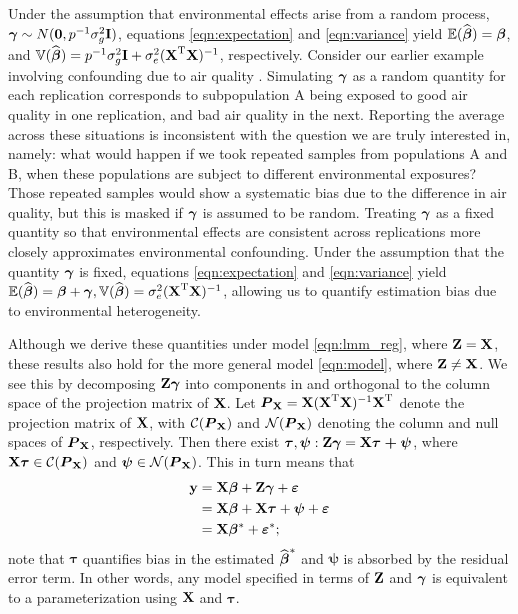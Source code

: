 Under the assumption that environmental effects arise from a random process, $\boldsymbol{\gamma} \sim N(\boldsymbol{0}, p^{-1} \sigma^2_g \textbf{I})$, equations \eqref{eqn:expectation} and \eqref{eqn:variance} yield $\mathbb{E}(\widehat{\boldsymbol{\beta}{}}) = \boldsymbol{\beta}{}$, and $\mathbb{V}(\widehat{\boldsymbol{\beta}{}}) = p^{-1}\sigma^2_g\textbf{I} + \sigma^2_e (\textbf{X}^{\text{T}} \textbf{X})^{-1}$, respectively. Consider our earlier example involving confounding due to air quality . Simulating $\boldsymbol{\gamma}$ as a random quantity for each replication corresponds to subpopulation A being exposed to good air quality in one replication, and bad air quality in the next. Reporting the average across these situations is inconsistent with the question we are truly interested in, namely: what would happen if we took repeated samples from populations A and B, when these populations are subject to different environmental exposures? Those repeated samples would show a systematic bias due to the difference in air quality, but this is masked if $\boldsymbol{\gamma}$ is assumed to be random. Treating $\boldsymbol{\gamma}$ as a fixed quantity so that environmental effects are consistent across replications more closely approximates environmental confounding. Under the assumption that the quantity $\boldsymbol{\gamma}$ is fixed, equations \eqref{eqn:expectation} and \eqref{eqn:variance} yield $\mathbb{E}(\widehat{\boldsymbol{\beta}{}}) = \boldsymbol{\beta}{} + \boldsymbol{\gamma}, \mathbb{V}(\widehat{\boldsymbol{\beta}{}}) = \sigma^2_e (\textbf{X}^{\text{T}} \textbf{X})^{-1}$, allowing us to quantify estimation bias due to environmental heterogeneity. 

Although we derive these quantities under model \eqref{eqn:lmm_reg}, where $\textbf{Z} = \textbf{X}$, these results also hold for the more general model \eqref{eqn:model}, where $\textbf{Z} \ne \textbf{X}$. We see this by decomposing $\textbf{Z} \boldsymbol{\gamma}$ into components in and orthogonal to the column space of the projection matrix of $\textbf{X}$.  Let $\boldsymbol{P}_{\textbf{X}} = \textbf{X} (\textbf{X}^{\text{T}} \textbf{X})^{-1} \textbf{X}^{\text{T}}$ denote the projection matrix of $\textbf{X}$, with $\mathcal{C}(\boldsymbol{P}_{\textbf{X}})$ and $\mathcal{N}(\boldsymbol{P}_{\textbf{X}})$ denoting the column and null spaces of $\boldsymbol{P}_{\textbf{X}}$, respectively. Then there exist $\boldsymbol{\tau}, \boldsymbol{\psi}: \textbf{Z} \boldsymbol{\gamma} = \textbf{X} \boldsymbol{\tau + \psi}$, where $\textbf{X} \boldsymbol{\tau} \in \mathcal{C}(\boldsymbol{P}_{\textbf{X}})$ and $\boldsymbol{\psi} \in \mathcal{N}(\boldsymbol{P}_{\textbf{X}})$.  This in turn means that
\begin{align*}
    \textbf{y} &= \textbf{X}\boldsymbol{\beta}{} + \textbf{Z}\boldsymbol{\gamma} + \boldsymbol{\varepsilon}{}\\
    &= \textbf{X}\boldsymbol{\beta}{} + \textbf{X} \boldsymbol{\tau} + \boldsymbol{\psi} + \boldsymbol{\varepsilon}{}\\
    &=  \textbf{X} \boldsymbol{\beta}{}{^*} + \boldsymbol{\varepsilon}{}{^*};
\end{align*}
note that $\boldsymbol{\tau}$ quantifies bias in the estimated $\widehat{\boldsymbol{\beta}{}}^*$ and $\boldsymbol{\psi}$ is absorbed by the residual error term. In other words, any model specified in terms of $\textbf{Z}$ and $\boldsymbol{\gamma}$ is equivalent to a parameterization using $\textbf{X}$ and $\boldsymbol{\tau}$.

